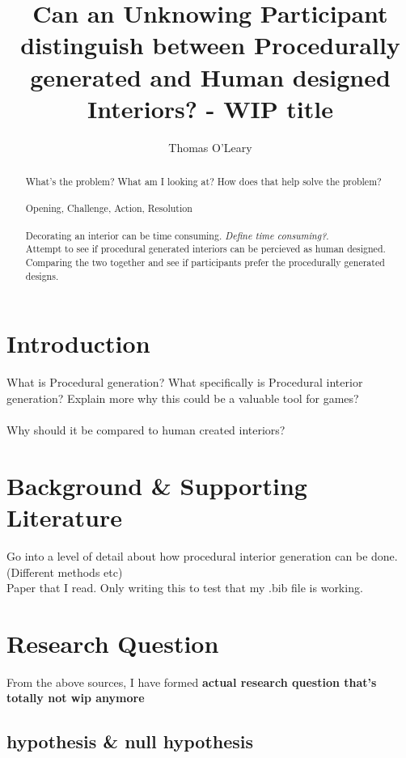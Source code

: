 \documentclass[lettersize,journal]{IEEEtran}
\begin{document}
\title{Can an Unknowing Participant distinguish between Procedurally generated and Human designed Interiors? - WIP title}

\author{Thomas O'Leary}

\maketitle

\begin{abstract}
    What's the problem? What am I looking at? How does that help solve the problem? \\
    \\
    Opening, Challenge, Action, Resolution \\
    \\
    Decorating an interior can be time consuming. \emph{Define time consuming?}.
    \\
    Attempt to see if procedural generated interiors can be percieved as human designed.
    Comparing the two together and see if participants prefer the procedurally generated designs.
\end{abstract}

\section{Introduction}
    What is Procedural generation? 
    What specifically is Procedural interior generation?
    Explain more why this could be a valuable tool for games?\\
    \\
    Why should it be compared to human created interiors?
    
\section{Background \& Supporting Literature}
    Go into a level of detail about how procedural interior generation can be done. (Different methods etc)
    \\
    Paper that I read. Only writing this to test that my .bib file is working. \cite{real-time}

\section{Research Question}
    From the above sources, I have formed \textbf{actual research question that's totally not wip anymore}
    \subsection{hypothesis \& null hypothesis}
\end{document}

